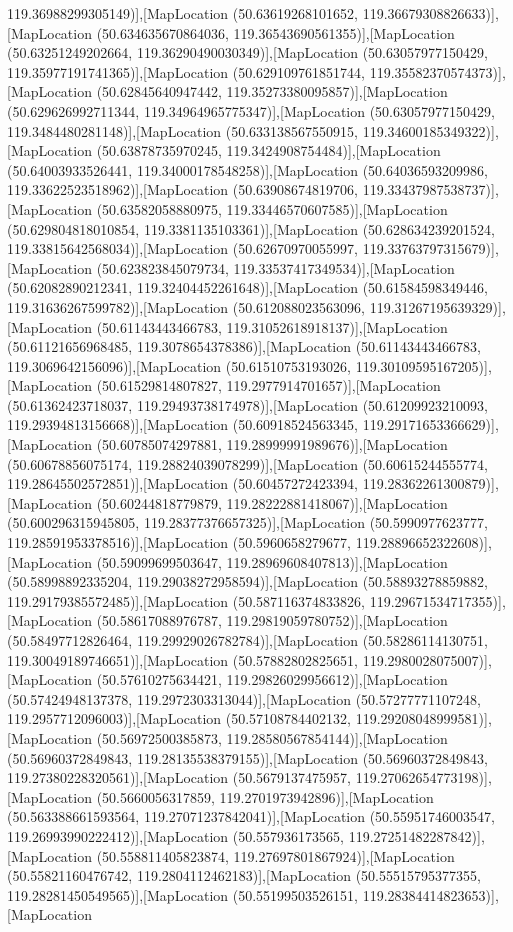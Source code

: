 119.36988299305149)],[MapLocation (50.63619268101652, 119.36679308826633)],[MapLocation (50.634635670864036, 119.36543690561355)],[MapLocation (50.63251249202664, 119.36290490030349)],[MapLocation (50.63057977150429, 119.35977191741365)],[MapLocation (50.629109761851744, 119.35582370574373)],[MapLocation (50.62845640947442, 119.35273380095857)],[MapLocation (50.629626992711344, 119.34964965775347)],[MapLocation (50.63057977150429, 119.3484480281148)],[MapLocation (50.633138567550915, 119.34600185349322)],[MapLocation (50.63878735970245, 119.3424908754484)],[MapLocation (50.64003933526441, 119.34000178548258)],[MapLocation (50.64036593209986, 119.33622523518962)],[MapLocation (50.63908674819706, 119.33437987538737)],[MapLocation (50.63582058880975, 119.33446570607585)],[MapLocation (50.629804818010854, 119.3381135103361)],[MapLocation (50.628634239201524, 119.33815642568034)],[MapLocation (50.62670970055997, 119.33763797315679)],[MapLocation (50.623823845079734, 119.33537417349534)],[MapLocation (50.62082890212341, 119.32404452261648)],[MapLocation (50.61584598349446, 119.31636267599782)],[MapLocation (50.612088023563096, 119.31267195639329)],[MapLocation (50.61143443466783, 119.31052618918137)],[MapLocation (50.61121656968485, 119.3078654378386)],[MapLocation (50.61143443466783, 119.3069642156096)],[MapLocation (50.61510753193026, 119.30109595167205)],[MapLocation (50.61529814807827, 119.2977914701657)],[MapLocation (50.61362423718037, 119.29493738174978)],[MapLocation (50.61209923210093, 119.29394813156668)],[MapLocation (50.60918524563345, 119.29171653366629)],[MapLocation (50.60785074297881, 119.28999991989676)],[MapLocation (50.60678856075174, 119.28824039078299)],[MapLocation (50.60615244555774, 119.28645502572851)],[MapLocation (50.60457272423394, 119.28362261300879)],[MapLocation (50.60244818779879, 119.28222881418067)],[MapLocation (50.600296315945805, 119.28377376657325)],[MapLocation (50.5990977623777, 119.28591953378516)],[MapLocation (50.5960658279677, 119.28896652322608)],[MapLocation (50.59099699503647, 119.28969608407813)],[MapLocation (50.58998892335204, 119.29038272958594)],[MapLocation (50.58893278859882, 119.29179385572485)],[MapLocation (50.587116374833826, 119.29671534717355)],[MapLocation (50.58617088976787, 119.29819059780752)],[MapLocation (50.58497712826464, 119.29929026782784)],[MapLocation (50.58286114130751, 119.30049189746651)],[MapLocation (50.57882802825651, 119.2980028075007)],[MapLocation (50.57610275634421, 119.29826029956612)],[MapLocation (50.57424948137378, 119.2972303313044)],[MapLocation (50.57277771107248, 119.2957712096003)],[MapLocation (50.57108784402132, 119.29208048999581)],[MapLocation (50.56972500385873, 119.28580567854144)],[MapLocation (50.56960372849843, 119.28135538379155)],[MapLocation (50.56960372849843, 119.27380228320561)],[MapLocation (50.5679137475957, 119.27062654773198)],[MapLocation (50.5660056317859, 119.2701973942896)],[MapLocation (50.563388661593564, 119.27071237842041)],[MapLocation (50.55951746003547, 119.26993990222412)],[MapLocation (50.557936173565, 119.27251482287842)],[MapLocation (50.558811405823874, 119.27697801867924)],[MapLocation (50.55821160476742, 119.2804112462183)],[MapLocation (50.55515795377355, 119.28281450549565)],[MapLocation (50.55199503526151, 119.28384414823653)],[MapLocation 
